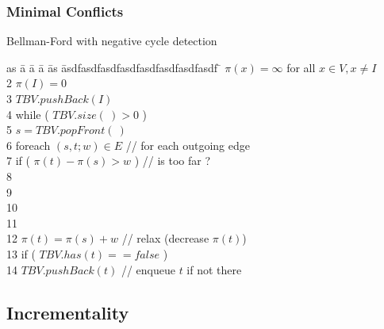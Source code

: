 \begin{frame}
  \frametitle{Minimal Conflicts}

  Bellman-Ford with negative cycle detection

  \begin{tabbing}
  as \= a \= a \= a \= as \= asdfasdfasdfasdfasdfasdfasdfasdf \=   \> $\pi(x) = \infty$ for all $x \in V, x \not= I$ \\
  2  \> $\pi(I) = 0$ \\
  3  \> $TBV.pushBack( I )$ \\
  4  \> while ( $TBV.size(\ ) > 0$ ) \\
  5  \> \> $s = TBV.popFront(\ )$ \\
  6  \> \> foreach $(s,t;w) \in E$         \> \> \> \> // for each outgoing edge \\
  7  \> \> \> if ( $\pi(t) - \pi(s) > w$ )    \> \> \> // is too far ? \\
  8  \> \> \> \>  \\
  9  \> \> \> \> \>  \\
  10 \> \> \> \>  \\
  11 \> \> \> \>  \\
  12  \> \> \> \> $\pi(t) = \pi(s) + w$           \> \> // relax (decrease $\pi(t)$) \\
  13  \> \> \> \> if ( $TBV.has( t ) == false$ ) \\ 
  14 \> \> \> \> \> $TBV.pushBack( t )$             \> // enqueue $t$ if not there \\
  \end{tabbing}

\end{frame}

\subsection{Incrementality}

